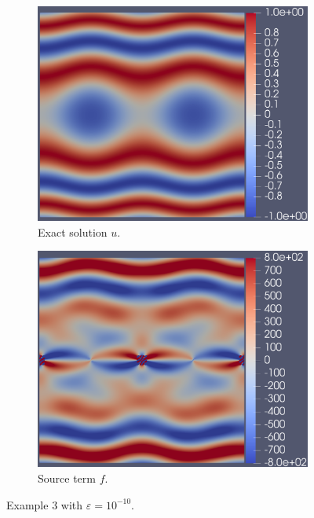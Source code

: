 \documentclass[12pt]{ociamthesis}
\begin{document}
\begin{figure}[H]
 \begin{subfigure}{0.5\textwidth}
     \includegraphics[width=\textwidth]{Pics/uf/U_E3_eps_10.png}
     \caption{Exact solution $u$.} \label{E3_u}
 \end{subfigure}
   \begin{subfigure}{0.5\textwidth}
     \includegraphics[width=\textwidth]{Pics/uf/F_E3_eps_10.png}
     \caption{Source term $f$.}
 \end{subfigure}
 \caption{Example $3$ with $\varepsilon = 10^{-10}$.} \label{E3_uf}
\end{figure}
\end{document}
